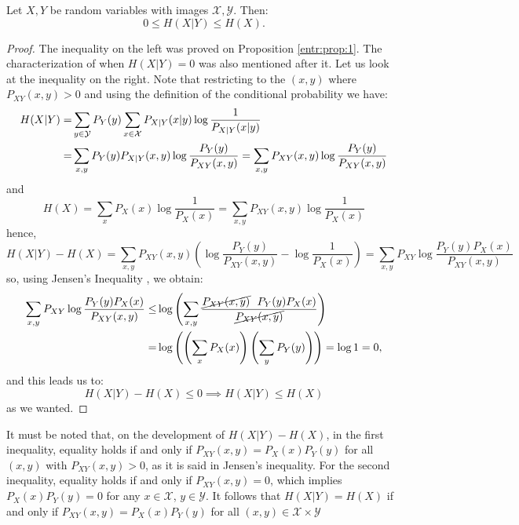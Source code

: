 \begin{nprop}\label{entr:prop:2}
Let $X,Y$ be random variables with images $\mathcal X, \mathcal Y$. Then:
$$
0 \leq H(X|Y) \leq H(X).
$$
\end{nprop}
\begin{proof}

The inequality on the left was proved on Proposition \cref{entr:prop:1}. The characterization of when $H(X|Y) = 0$ was also mentioned after it.
Let us look at the inequality on the right. Note that restricting to the $(x,y)$ where $P_{XY}(x,y) > 0$ and using the definition of the conditional probability we have:
\begin{align*}
H(X|Y) = & \sum_{y \in \mathcal{Y}} P_Y(y) \sum_{x \in \mathcal{X}} P_{X|Y}(x|y)\log \frac{1}{P_{X|Y}(x|y)}\\ = & \sum_{x,y} P_Y(y) P_{X|Y}(x,y) \log \frac{P_Y(y)}{P_{XY}(x,y)} = \sum_{x,y} P_{XY}(x,y)\log \frac{P_Y(y)}{P_{XY}(x,y)} 
\end{align*}
and 
$$
H(X) = \sum_x P_X(x) \log \frac{1}{P_X(x)} = \sum_{x,y}P_{XY}(x,y) \log \frac{1}{P_X(x)}
$$
hence,
\begin{equation}\label{eq:dif-expr-mi}
H(X|Y) - H(X) = \sum_{x,y}P_{XY}(x,y) \left( \log \frac{P_Y(y)}{P_{XY}(x,y)} - \log \frac{1}{P_X(x)}\right) = \sum_{x,y}P_{XY}\log \frac{P_Y(y)P_X(x)}{P_{XY}(x,y)}
\end{equation}
so, using Jensen's Inequality , we obtain:
\begin{align*}
\sum_{x,y}P_{XY}\log \frac{P_Y(y)P_X(x)}{P_{XY}(x,y)} \leq & \log \left( \sum_{x,y}\frac{ \cancel{P_{XY}(x,y)} \ \  P_Y(y) P_X(x)}{\cancel{P_{XY}(x,y)}} \right) \\ 
= & \log\left( \left( \sum_x P_X(x) \right) \left(\sum_y P_Y(y)\right)\right) = \log 1 = 0,
\end{align*}
and this leads us to:
$$
H(X|Y) - H(X) \leq 0 \implies H(X|Y) \leq H(X)
$$
as we wanted.
\end{proof}

It must be noted that, on the development of $H(X|Y) - H(X)$, in the first inequality, equality holds if and only if $P_{XY}(x,y) = P_X(x) P_Y(y)$ for all $(x,y)$ with $P_{XY} (x,y) > 0$, as it is said in Jensen's inequality. For the second inequality, equality holds if and only if $P_{XY}(x,y) = 0$, which implies $P_X(x)P_Y(y) = 0$ for any $x\in \mathcal X$, $y \in \mathcal Y$. It follows that $H(X|Y) = H(X)$ if and only if $P_{XY}(x,y) = P_X(x)P_Y(y)$ for all $(x,y) \in \mathcal X \times \mathcal Y$

